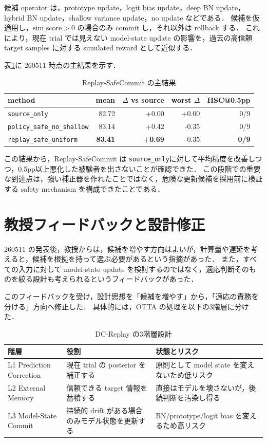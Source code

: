 \documentclass[a4paper,11pt]{ltjsarticle}
\makeatletter
\newcommand{\source}{\texttt{source\_only}}
\newcommand{\replay}{\texttt{replay\_safe\_uniform}}
\newcommand{\hsc}{HSC@0.5pp}
\makeatother
\begin{document}
候補 operator は，prototype update，logit bias update，deep BN update，hybrid BN update，shallow variance update，no update などである．
候補を仮適用し，\(\mathrm{sim\_score} > 0\) の場合のみ commit し，それ以外は rollback する．
これにより，現在 trial では見えない model-state update の影響を，過去の高信頼 target samples に対する simulated reward として近似する．

表\ref{tab:replay-result}に 260511 時点の主結果を示す．

\begin{table}[h]
  \centering
  \caption{Replay-SafeCommit の主結果}
  \label{tab:replay-result}
  \begin{tabular}{lrrrr}
    \toprule
    method & mean & $\Delta$ vs source & worst $\Delta$ & \hsc \\
    \midrule
    \source & 82.72 & +0.00 & +0.00 & 0/9 \\
    \texttt{policy\_safe\_no\_shallow} & 83.14 & +0.42 & -0.35 & 0/9 \\
    \replay & \textbf{83.41} & \textbf{+0.69} & -0.35 & \textbf{0/9} \\
    \bottomrule
  \end{tabular}
\end{table}

この結果から，Replay-SafeCommit は \source に対して平均精度を改善しつつ，0.5pp以上悪化した被験者を出さないことが確認できた．
この段階での重要な到達点は，強い補正器を作れたことではなく，危険な更新候補を採用前に検証する safety mechanism を構成できたことである．

\section{教授フィードバックと設計修正}

260511 の発表後，教授からは，候補を増やす方向はよいが，計算量や遅延を考えると，候補を根拠を持って選ぶ必要があるという指摘があった．
また，すべての入力に対して model-state update を検討するのではなく，適応判断そのものを絞る設計も考えられるというフィードバックがあった．

このフィードバックを受け，設計思想を「候補を増やす」から，「適応の責務を分ける」方向へ修正した．
具体的には，OTTA の処理を以下の3階層に分けた．

\begin{table}[h]
  \centering
  \caption{DC-Replay の3階層設計}
  \label{tab:three-levels}
  \begin{tabular}{p{}p{}p{}}
    \toprule
    階層 & 役割 & 状態とリスク \\
    \midrule
    L1 Prediction Correction & 現在 trial の posterior を補正する & 原則として model state を変えないため低リスク \\
    L2 External Memory & 信頼できる target 情報を蓄積する & 直接はモデルを壊さないが，後続判断を汚染し得る \\
    L3 Model-State Commit & 持続的 drift がある場合のみモデル状態を更新する & BN/prototype/logit bias を変えるため高リスク \\
    \bottomrule
  \end{tabular}
\end{table}
\end{document}
